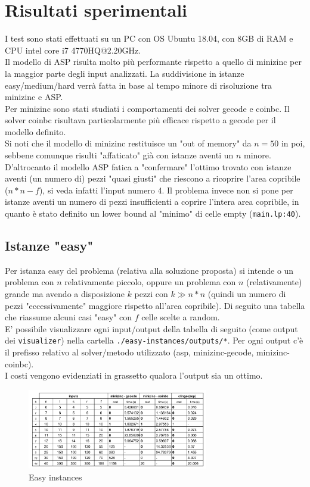 \documentclass{article}
\begin{document}
\section{Risultati sperimentali}
I test sono stati effettuati su un PC con OS Ubuntu 18.04, con 8GB di RAM e CPU intel core i7 4770HQ@2.20GHz.\\
Il modello di ASP risulta molto più performante rispetto a quello di minizinc per la maggior parte degli input analizzati. La suddivisione in istanze easy/medium/hard verrà fatta in base al tempo minore di risoluzione tra minizinc e ASP.\\
Per minizinc sono stati studiati i comportamenti dei solver gecode e coinbc. Il solver coinbc risultava particolarmente più efficace rispetto a gecode per il modello definito. \\Si noti che il modello di minizinc restituisce un "out of memory" da $n=50$ in poi, sebbene comunque risulti "affaticato" già con istanze aventi un $n$ minore.\\
D'altrocanto il modello ASP fatica a "confermare" l'ottimo trovato con istanze aventi (un numero di) pezzi "quasi giusti" che riescono a ricoprire l'area copribile ($n*n - f$), si veda infatti l'input numero 4. Il problema invece non si pone per istanze aventi un numero di pezzi insufficienti a coprire l'intera area copribile, in quanto è stato definito un lower bound al "minimo" di celle empty (\texttt{main.lp:40}).\\

\subsection{Istanze "easy"} 
Per istanza easy del problema (relativa alla soluzione proposta) si intende o un problema con $n$ relativamente piccolo, oppure un problema con $n$ (relativamente) grande ma avendo a disposizione $k$ pezzi con $k \gg n*n$ (quindi un numero di pezzi "eccessivamente" maggiore rispetto all'area copribile). Di seguito una tabella che riassume alcuni casi "easy" con $f$ celle scelte a random.\\
E' possibile visualizzare ogni input/output della tabella di seguito (come output dei \texttt{visualizer}) nella cartella \texttt{./easy-instances/outputs/*}. Per ogni output c'è il prefisso relativo al solver/metodo utilizzato (asp, minizinc-gecode, minizinc-coinbc).\\I costi vengono evidenziati in grassetto qualora l'output sia un ottimo.
\begin{figure}[ht!]
    \centering
    \includegraphics[width=0.7\textwidth]{images/easy-instances.png}
    \caption{Easy instances}
\end{figure}
\end{document}
